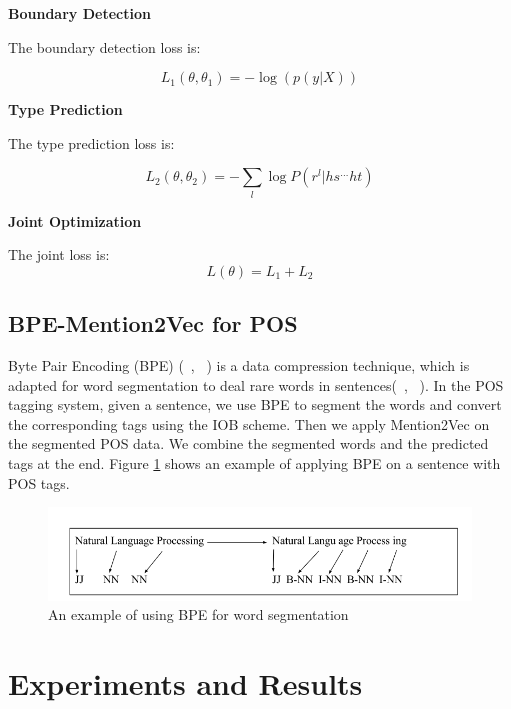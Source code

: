 \documentclass{sfuthesis}
\begin{document}
\textbf{Boundary Detection} 

The boundary detection loss is:

\begin{equation}
  L_{1}\left( \theta ,\theta _{1}\right) =-\log \left( p\left( y|X\right) \right) 
\end{equation}

\textbf{Type Prediction}

The type prediction loss is:

\begin{equation}
  L_{2}\left( \theta ,\theta _{2}\right) =-\sum _{l}\log P\left( r^{l}|hs^{\ldots }ht\right)
\end{equation}

\textbf{Joint Optimization}

The joint loss is:
\begin{equation}
  L\left( \theta \right) =L_{1}+L_{2}  
\end{equation}

\subsection{BPE-Mention2Vec for POS}
Byte Pair Encoding (BPE) (~\citeauthor{gage1994new}, ~\citeyear{gage1994new}) is a data compression technique, which is adapted for word segmentation to deal rare words in sentences(~\citeauthor{sennrich2015neural}, ~\citeyear{sennrich2015neural}). In the POS tagging system, given a sentence, we use BPE to segment the words and convert the corresponding tags using the IOB scheme. Then we apply Mention2Vec on the segmented POS data. We combine the segmented words and the predicted tags at the end. Figure \ref{fig:bpe} shows an example of applying BPE on a sentence with POS tags. 

\begin{figure}
  \centering
  \includegraphics[scale=0.6]{bpe.png}
 \caption{An example of using BPE for word segmentation}
  \label{fig:bpe}
\end{figure}

\section{Experiments and Results}
\end{document}
